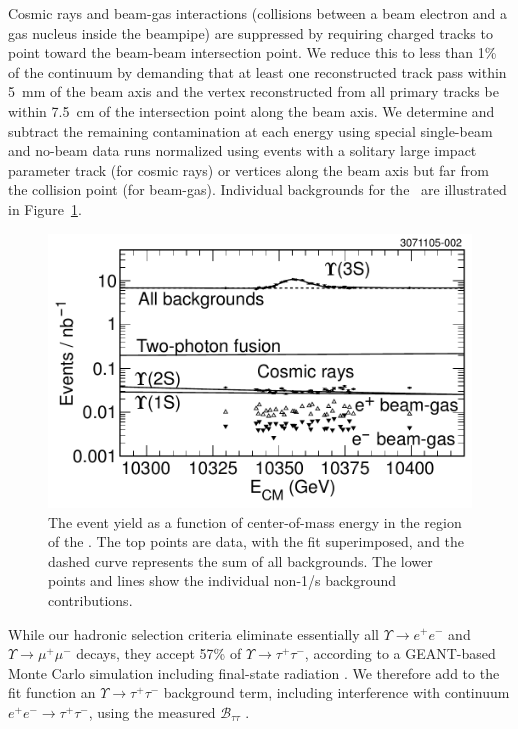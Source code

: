 \documentclass[aps,prl,twocolumn,superscriptaddress,showpacs,floatfix]{revtex4}
\begin{document}
Cosmic rays and beam-gas interactions (collisions between a beam
electron and a gas nucleus inside the beampipe) are suppressed by
requiring charged tracks to point toward the beam-beam intersection
point.  We reduce this to less than 1\% of the continuum by demanding
that at least one reconstructed track pass within 5~mm of the beam
axis and the vertex reconstructed from all primary tracks be within
7.5~cm of the intersection point along the beam axis.  We determine
and subtract the remaining contamination at each energy using special
single-beam and no-beam data runs normalized using events with a
solitary large impact parameter track (for cosmic rays) or vertices
along the beam axis but far from the collision point (for beam-gas).
Individual backgrounds for the \usss\ are illustrated in Figure~\ref{fig:backgrounds}.

\begin{figure}
  \includegraphics[width=\linewidth]{backgrounds}
  \caption{\label{fig:backgrounds} The event yield as a function of
center-of-mass energy in the region of the \usss.  The top points are
data, with the fit superimposed, and the dashed curve represents the
sum of all backgrounds.  The lower points and lines show the
individual non-1/s background contributions.}
\end{figure}

While our hadronic selection criteria eliminate essentially all
$\Upsilon \to e^+e^-$ and $\Upsilon \to \mu^+\mu^-$ decays, they
accept 57\% of $\Upsilon \to \tau^+\tau^-$, according to a GEANT-based
Monte Carlo simulation \cite{mc} including final-state radiation
\cite{photos}.  We therefore add to the fit function an $\Upsilon
\to \tau^+\tau^-$ background term, including interference with
continuum $e^+e^- \to \tau^+\tau^-$, using the measured ${\mathcal
B}_{\tau\tau}$ \cite{jean}.
\end{document}
